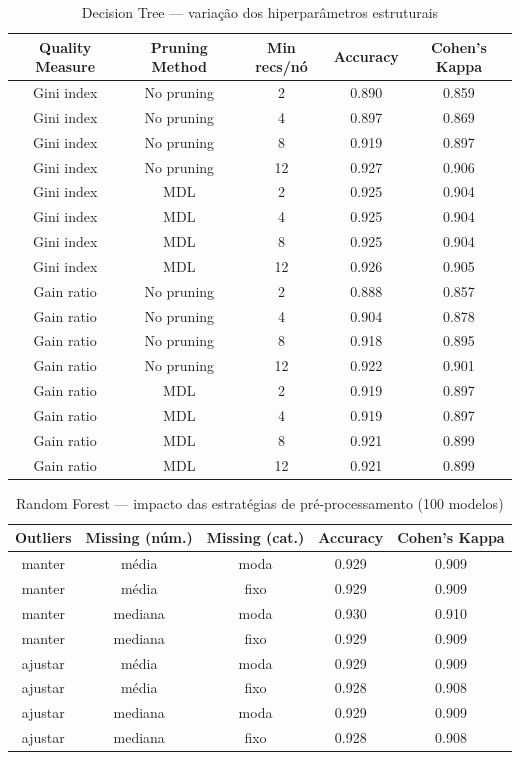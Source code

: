 \documentclass[11pt,a4paper]{article}
\begin{document}
\begin{table}[H]
    \centering
    \caption{Decision Tree --- variação dos hiperparâmetros estruturais}
    \label{tab:dt_hiperparametros}
    \begin{tabular}{ccccc}
    \toprule
    Quality Measure & Pruning Method & Min recs/nó & Accuracy & Cohen's Kappa \\
    \midrule
    Gini index & No pruning & 2 & 0.890 & 0.859 \\
    Gini index & No pruning & 4 & 0.897 & 0.869 \\
    Gini index & No pruning & 8 & 0.919 & 0.897 \\
    Gini index & No pruning & 12 & 0.927 & 0.906 \\
    Gini index & MDL & 2 & 0.925 & 0.904 \\
    Gini index & MDL & 4 & 0.925 & 0.904 \\
    Gini index & MDL & 8 & 0.925 & 0.904 \\
    Gini index & MDL & 12 & 0.926 & 0.905 \\
    Gain ratio & No pruning & 2 & 0.888 & 0.857 \\
    Gain ratio & No pruning & 4 & 0.904 & 0.878 \\
    Gain ratio & No pruning & 8 & 0.918 & 0.895 \\
    Gain ratio & No pruning & 12 & 0.922 & 0.901 \\
    Gain ratio & MDL & 2 & 0.919 & 0.897 \\
    Gain ratio & MDL & 4 & 0.919 & 0.897 \\
    Gain ratio & MDL & 8 & 0.921 & 0.899 \\
    Gain ratio & MDL & 12 & 0.921 & 0.899 \\
    \bottomrule
    \end{tabular}
\end{table}

\begin{table}[H]
    \centering
    \caption{Random Forest --- impacto das estratégias de pré-processamento (100 modelos)}
    \label{tab:rf_attr_preprocessamento}
    \begin{tabular}{ccccc}
    \toprule
    Outliers & Missing (núm.) & Missing (cat.) & Accuracy & Cohen's Kappa \\
    \midrule
    manter & média & moda & 0.929 & 0.909 \\
    manter & média & fixo & 0.929 & 0.909 \\
    manter & mediana & moda & 0.930 & 0.910 \\
    manter & mediana & fixo & 0.929 & 0.909 \\
    ajustar & média & moda & 0.929 & 0.909 \\
    ajustar & média & fixo & 0.928 & 0.908 \\
    ajustar & mediana & moda & 0.929 & 0.909 \\
    ajustar & mediana & fixo & 0.928 & 0.908 \\
    \bottomrule
    \end{tabular}
\end{table}
\end{document}
